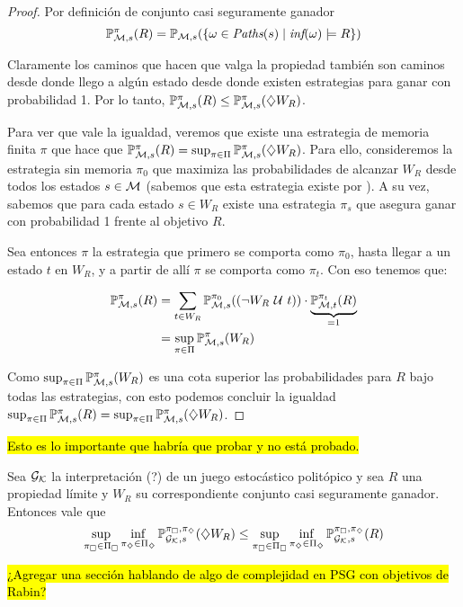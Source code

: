 \begin{proof}
	Por definición de conjunto casi seguramente ganador
	$$
		\mathbb{P}_{\mathcal{M},s}^\pi (R) = \mathbb{P}_{\mathcal{M},s}(\{ \omega \in \textit{Paths}(s) \mid \textit{inf}(\omega) \models R\})
	$$

	Claramente los caminos que hacen que valga la propiedad también son caminos
	desde donde llego a algún estado desde donde existen estrategias para ganar con
	probabilidad 1. Por lo tanto, $\mathbb{P}_{\mathcal{M}, s}^\pi (R) \leq \mathbb{P}_{\mathcal{M}, s}^\pi (\diamondsuit W_R)$.

	Para ver que vale la igualdad, veremos que existe una estrategia de memoria
	finita $\pi$ que hace que $\mathbb{P}_{\mathcal{M}, s}^\pi (R) = \sup_{\pi \in \Pi} \mathbb{P}_{\mathcal{M}, s}^\pi (\diamondsuit
		W_R) $. Para ello, consideremos la estrategia sin memoria $\pi_0$ que maximiza
	las probabilidades de alcanzar $W_R$ desde todos los estados $s \in \mathcal{M}$
	(sabemos que esta estrategia existe por \cite{Polytopal, CONDON1992}). A su
	vez, sabemos que para cada estado $s \in W_R$ existe una estrategia $\pi_s$ que
	asegura ganar con probabilidad 1 frente al objetivo $R$.

	Sea entonces $\pi$ la estrategia que primero se comporta como $\pi_0$, hasta
	llegar a un estado $t$ en $W_R$, y a partir de allí $\pi$ se comporta como
	$\pi_t$. Con eso tenemos que:

	\begin{align*}
		\mathbb{P}_{\mathcal{M}, s}^\pi (R) &= \sum_{t \in W_R} \mathbb{P}_{\mathcal{M},s}^{\pi_0} ((\neg W_R \ \mathcal{U} \  t)) \cdot \underbrace{\mathbb{P}_{\mathcal{M},t}^{\pi_t}(R)}_{=1} \\
		&= \sup_{\pi \in \Pi} \mathbb{P}_{\mathcal{M}, s}^\pi (W_R)
	\end{align*}

	Como $\sup_{\pi \in \Pi} \mathbb{P}_{\mathcal{M}, s}^\pi (W_R)$ es una cota superior las
	probabilidades para $R$ bajo todas las estrategias, con esto podemos concluir
	la igualdad $\sup_{\pi \in \Pi} \mathbb{P}_{\mathcal{M}, s}^\pi (R) = \sup_{\pi \in \Pi} \mathbb{P}_{\mathcal{M}, s}^\pi
		(\diamondsuit W_R)$.
\end{proof}

\hl{Esto es lo importante que habría que probar y no está probado.}

\begin{lemma}
	\label{**2}
	Sea $\mathcal{G}_{\mathcal{K}}$ la interpretación (?) de un juego estocástico politópico y sea $R$ una propiedad límite y $W_R$ su correspondiente conjunto casi seguramente ganador. Entonces vale que
	$$
		\sup_{\pi_\square \in \Pi_\square} \inf_{\pi_\diamondsuit \in \Pi_\diamondsuit} \mathbb{P}_{\mathcal{G}_{\mathcal{K}}, s}^{\pi_\square, \pi_\diamondsuit} (\diamondsuit W_R) \leq \sup_{\pi_\square \in \Pi_\square} \inf_{\pi_\diamondsuit \in \Pi_\diamondsuit}  \mathbb{P}_{\mathcal{G}_{\mathcal{K}}, s}^{\pi_\square, \pi_\diamondsuit} (R)
	$$
\end{lemma}

\hl{¿Agregar una sección hablando de algo de complejidad en PSG con objetivos de Rabin?}
